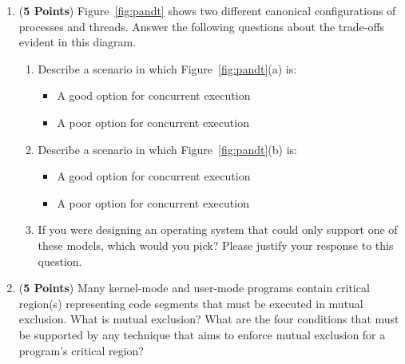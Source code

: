 \documentclass[12pt,epsf,psfig,graphics]{article}
\begin{document}
\begin{enumerate}
\begin{enumerate}

  \item ({\bf 5 Points}) Figure~\ref{fig:pandt} shows two different canonical configurations of processes and threads. Answer the
    following questions about the trade-offs evident in this diagram.

    \begin{enumerate}

      \item Describe a scenario in which Figure~\ref{fig:pandt}(a) is:

        \begin{itemize}

          \item A good option for concurrent execution
          \item A poor option for concurrent execution

        \end{itemize}

      \item Describe a scenario in which Figure~\ref{fig:pandt}(b) is:

        \begin{itemize}

          \item A good option for concurrent execution
          \item A poor option for concurrent execution

        \end{itemize}

      \item If you were designing an operating system that could only support one of these models, which would you pick?
        Please justify your response to this question.

    \end{enumerate}

  \item ({\bf 5 Points}) Many kernel-mode and user-mode programs contain critical region(s) representing code
    segments that must be executed in mutual exclusion.  What is mutual exclusion? What are the four conditions that
    must be supported by any technique that aims to enforce mutual exclusion for a program's critical region?

\end{enumerate}

\end{enumerate}
\end{document}
